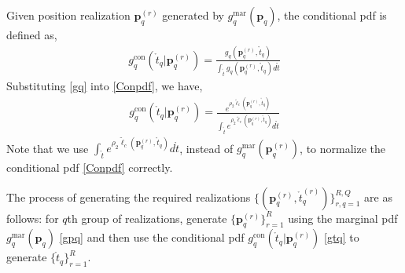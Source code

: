 \documentclass[review]{elsarticle}
\begin{document}
Given position realization $\boldsymbol{p}_q^{(r)}$ generated by $g_{q}^{\text{mar}}(\boldsymbol{p}_q)$, the conditional pdf is defined as,
\begin{align}\label{Conpdf}
    g_{q}^{\text{con}}(\mathring{t}_q\vert \boldsymbol{p}_q^{(r)})=\frac{g_q(\boldsymbol{p}_q^{(r)},\mathring{t}_q)}{\int_{\mathring{t}}g_q(\boldsymbol{p}_q^{(r)},\mathring{t}_q)d\mathring{t}}
\end{align}
Substituting \eqref{gq} into \eqref{Conpdf}, we have,
\begin{align}\label{gtq}
    g_{q}^{\text{con}}(\mathring{t}_q\vert \boldsymbol{p}_q^{(r)})=\frac{e^{\rho_2 \tilde{\ell}_c(\boldsymbol{p}^{(r)}_q,\mathring{t}_q)}}{\int_{\mathring{t}}e^{\rho_2 \tilde{\ell}_c(\boldsymbol{p}^{(r)}_q,\mathring{t}_q)}d\mathring{t}}
\end{align}
Note that we use $\int_{\mathring{t}}e^{\rho_2 \tilde{\ell}_c(\boldsymbol{p}^{(r)}_q,\mathring{t}_q)}d\mathring{t}$, instead of $g_{q}^{\text{mar}}(\boldsymbol{p}_q^{(r)})$, to normalize the conditional pdf \eqref{Conpdf} correctly. 

The process of generating the required realizations $\lbrace(\boldsymbol{p}_q^{(r)},\mathring{t}_q^{(r)})\rbrace_{r,q=1}^{R,Q}$ are as follows: for $q$th group of realizations, generate $\lbrace \boldsymbol{p}_q^{(r)}\rbrace_{r=1}^R$ using the marginal pdf $g_{q}^{\text{mar}}(\boldsymbol{p}_q)$ \eqref{gpq} and then use the conditional pdf $g_{q}^{\text{con}}(\mathring{t}_q\vert \boldsymbol{p}_q^{(r)})$ \eqref{gtq} to generate $\lbrace \mathring{t}_q\rbrace_{r=1}^R$.
\end{document}
